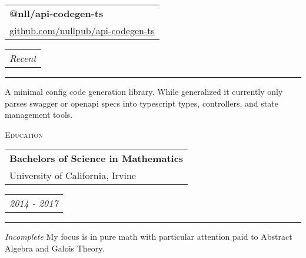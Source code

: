 \documentclass{article}
\makeatletter
\newcommand{\split}[3]{
\noindent\begin{tabular}[t]{@{}l}
    \textbf{#1} \\ #2
\end{tabular}
\hfill
\begin{tabular}[t]{l@{}}
    \\
    \textit{#3}
\end{tabular}
\noindent\rule{\columnwidth}{0.5pt}
}
\newcommand{\sub}[1]{
    {\raggedleft
        \large{\textsc{\color{OliveGreen}#1}}\par
    }
}
\makeatother
\begin{document}
\begin{multicols}{2}
\split{@nll/api-codegen-ts}{\href{https://github.com/nullpub/api-codegen-ts}{github.com/nullpub/api-codegen-ts}}{Recent}
A minimal config code generation library. While generalized it currently only parses swagger or openapi specs into typescript types, controllers, and state management tools.

\sub{Education}
\split{Bachelors of Science in Mathematics}{University of California, Irvine}{2014 - 2017}
\textit{Incomplete} My focus is in pure math with particular attention paid to Abstract Algebra and Galois Theory.

\end{multicols}
\end{document}
